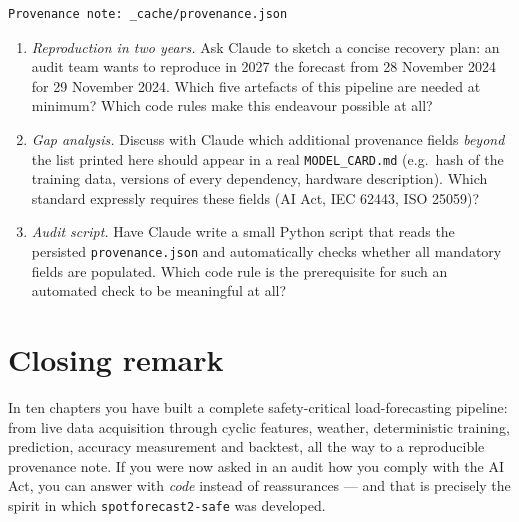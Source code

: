 \documentclass[
  english,
  letterpaper,
]{scrbook}
\providecommand{\tightlist}{%
  \setlength{\itemsep}{0pt}\setlength{\parskip}{0pt}}
\begin{document}
\begin{verbatim}
Provenance note: _cache/provenance.json
\end{verbatim}

\begin{tcolorbox}[enhanced jigsaw, arc=.35mm, bottomrule=.15mm, bottomtitle=1mm, breakable, colback=white, colbacktitle=quarto-callout-tip-color!10!white, colframe=quarto-callout-tip-color-frame, coltitle=black, left=2mm, leftrule=.75mm, opacityback=0, opacitybacktitle=0.6, rightrule=.15mm, title=\textcolor{quarto-callout-tip-color}{\faLightbulb}\hspace{0.5em}{Exercises (with Claude)}, titlerule=0mm, toprule=.15mm, toptitle=1mm]

\begin{enumerate}
\def\labelenumi{\arabic{enumi}.}
\tightlist
\item
  \emph{Reproduction in two years.} Ask Claude to sketch a concise
  recovery plan: an audit team wants to reproduce in 2027 the forecast
  from 28 November 2024 for 29 November 2024. Which five artefacts of
  this pipeline are needed at minimum? Which code rules make this
  endeavour possible at all?
\item
  \emph{Gap analysis.} Discuss with Claude which additional provenance
  fields \emph{beyond} the list printed here should appear in a real
  \texttt{MODEL\_CARD.md} (e.g.~hash of the training data, versions of
  every dependency, hardware description). Which standard expressly
  requires these fields (AI Act, IEC 62443, ISO 25059)?
\item
  \emph{Audit script.} Have Claude write a small Python script that
  reads the persisted \texttt{provenance.json} and automatically checks
  whether all mandatory fields are populated. Which code rule is the
  prerequisite for such an automated check to be meaningful at all?
\end{enumerate}

\end{tcolorbox}

\section{Closing remark}\label{closing-remark}

In ten chapters you have built a complete safety-critical
load-forecasting pipeline: from live data acquisition through cyclic
features, weather, deterministic training, prediction, accuracy
measurement and backtest, all the way to a reproducible provenance note.
If you were now asked in an audit how you comply with the AI Act, you
can answer with \emph{code} instead of reassurances --- and that is
precisely the spirit in which \texttt{spotforecast2-safe} was developed.
\end{document}
